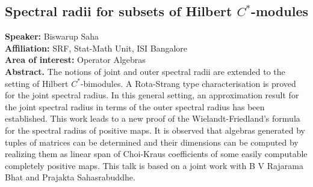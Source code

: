 \subsection*{Spectral radii for subsets of Hilbert $C^\ast$-modules} %
\noindent
\textbf{Speaker:} Biswarup Saha \\ %
\textbf{Affiliation:} SRF, Stat-Math Unit, ISI Bangalore\\ %
\textbf{Area of interest:} Operator Algebras \\

\noindent\textbf{Abstract.} The notions of joint and outer spectral radii are extended to the setting of Hilbert $C^\ast$-bimodules. A Rota-Strang type characterisation is proved for the joint spectral radius. In this general setting, an approximation result for the joint spectral radius in terms of the outer spectral radius has been established.
This work leads to a new proof of the Wielandt-Friedland's formula for the spectral radius of positive maps. It is observed that algebras generated by tuples of matrices can be determined and their dimensions can be computed by realizing them as linear span of Choi-Kraus coefficients of some easily computable completely positive maps.  This talk is based on a joint work with B V Rajarama Bhat and Prajakta Sahasrabuddhe.

